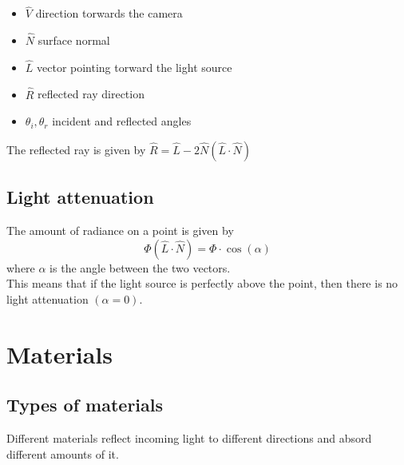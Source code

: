 \documentclass[a4paper]{article}
\begin{document}
\begin{itemize}
    \item \(\hat{V}\) direction torwards the camera
    \item \(\hat{N}\) surface normal
    \item \(\hat{L}\) vector pointing torward the light source
    \item \(\hat{R}\) reflected ray direction
    \item \({\theta}_i, {\theta}_r\) incident and reflected angles
\end{itemize}

The reflected ray is given by \(\hat{R}=\hat{L}-2\hat{N}(\hat{L}\cdot\hat{N})\)

\subsection{Light attenuation}

The amount of radiance on a point is given by
\[
    \Phi \left(\hat{L} \cdot \hat{N}\right) = \Phi \cdot \cos(\alpha)
\]
where \(\alpha\) is the angle between the two vectors.
\\
This means that if the light source is perfectly above the point, then
there is no light attenuation \((\alpha = 0)\).

\pagebreak

\section{Materials}

\subsection{Types of materials}

Different materials reflect incoming light to different directions and absord different amounts of it.
\end{document}

